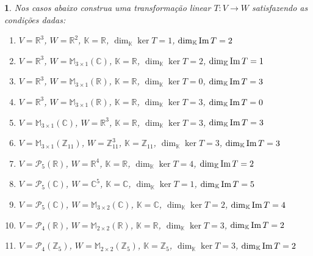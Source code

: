 \documentclass[12pt]{exam}
\newtheorem{exercicio}{}
\newcommand{\im}{{\rm Im\,}}
\newcommand{\z}{\mathbb{Z}}
\newcommand{\real}{\mathbb{R}}
\newcommand{\complex}{\mathbb{C}}
\newcommand{\cp}[1]{\mathbb{#1}}
\begin{document}
\begin{exercicio}
  Nos casos abaixo construa uma transforma\c{c}\~ao linear $T : V \to W$ satisfazendo as condi\c{c}\~oes dadas:
  \begin{enumerate}[label=({\alph*})]
    \item $V = \real^3$, $W = \real^2$, $\cp{K} = \real$, $\dim_\cp{K} \ker T = 1$, $\dim_\cp{K} \im T = 2$
    \item $V = \real^3$, $W = \cp{M}_{3\times 1}(\complex)$, $\cp{K} = \real$, $\dim_\cp{K} \ker T = 2$, $\dim_\cp{K} \im T = 1$
    \item $V = \real^3$, $W = \cp{M}_{3\times 1}(\real)$, $\cp{K} = \real$, $\dim_\cp{K} \ker T = 0$, $\dim_\cp{K} \im T = 3$
    \item $V = \real^3$, $W = \cp{M}_{3\times 1}(\real)$, $\cp{K} = \real$, $\dim_\cp{K} \ker T = 3$, $\dim_\cp{K} \im T = 0$
    \item $V = \cp{M}_{3\times 1}(\complex)$, $W = \real^3$, $\cp{K} = \real$, $\dim_\cp{K} \ker T = 3$, $\dim_\cp{K} \im T = 3$
    \item $V = \cp{M}_{3\times 1}(\z_{11})$, $W = \z_{11}^3$, $\cp{K} = \z_{11}$, $\dim_\cp{K} \ker T = 3$, $\dim_\cp{K} \im T = 3$
    \item $V = \mathcal{P}_5(\real)$, $W = \real^4$, $\cp{K} = \real$, $\dim_\cp{K} \ker T = 4$, $\dim_\cp{K} \im T = 2$
    \item $V = \mathcal{P}_5(\complex)$, $W = \complex^5$, $\cp{K} = \complex$, $\dim_\cp{K} \ker T = 1$, $\dim_\cp{K} \im T = 5$
    \item $V = \mathcal{P}_5(\complex)$, $W = \cp{M}_{3\times 2}(\complex)$, $\cp{K} = \complex$, $\dim_\cp{K} \ker T = 2$, $\dim_\cp{K} \im T = 4$
    \item $V = \mathcal{P}_4(\real)$, $W = \cp{M}_{2\times 2}(\real)$, $\cp{K} = \real$, $\dim_\cp{K} \ker T = 3$, $\dim_\cp{K} \im T = 2$
    \item $V = \mathcal{P}_4(\z_5)$, $W = \cp{M}_{2\times 2}(\z_5)$, $\cp{K} = \z_5$, $\dim_\cp{K} \ker T = 3$, $\dim_\cp{K} \im T = 2$
  \end{enumerate}
\end{exercicio}
\end{document}
